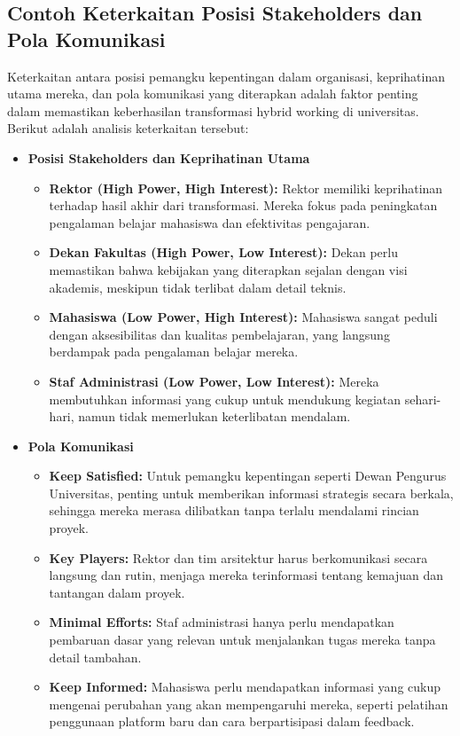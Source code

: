 \subsection*{Contoh Keterkaitan Posisi Stakeholders dan Pola Komunikasi}

Keterkaitan antara posisi pemangku kepentingan dalam organisasi, keprihatinan utama mereka, dan pola komunikasi yang diterapkan adalah faktor penting dalam memastikan keberhasilan transformasi hybrid working di universitas. Berikut adalah analisis keterkaitan tersebut:

\begin{itemize}
	\item \textbf{Posisi Stakeholders dan Keprihatinan Utama}
	\begin{itemize}
		\item \textbf{Rektor (High Power, High Interest):} Rektor memiliki keprihatinan terhadap hasil akhir dari transformasi. Mereka fokus pada peningkatan pengalaman belajar mahasiswa dan efektivitas pengajaran.
		\item \textbf{Dekan Fakultas (High Power, Low Interest):} Dekan perlu memastikan bahwa kebijakan yang diterapkan sejalan dengan visi akademis, meskipun tidak terlibat dalam detail teknis. 
		\item \textbf{Mahasiswa (Low Power, High Interest):} Mahasiswa sangat peduli dengan aksesibilitas dan kualitas pembelajaran, yang langsung berdampak pada pengalaman belajar mereka.
		\item \textbf{Staf Administrasi (Low Power, Low Interest):} Mereka membutuhkan informasi yang cukup untuk mendukung kegiatan sehari-hari, namun tidak memerlukan keterlibatan mendalam.
	\end{itemize}
	
	\item \textbf{Pola Komunikasi}
	\begin{itemize}
		\item \textbf{Keep Satisfied:} Untuk pemangku kepentingan seperti Dewan Pengurus Universitas, penting untuk memberikan informasi strategis secara berkala, sehingga mereka merasa dilibatkan tanpa terlalu mendalami rincian proyek.
		\item \textbf{Key Players:} Rektor dan tim arsitektur harus berkomunikasi secara langsung dan rutin, menjaga mereka terinformasi tentang kemajuan dan tantangan dalam proyek.
		\item \textbf{Minimal Efforts:} Staf administrasi hanya perlu mendapatkan pembaruan dasar yang relevan untuk menjalankan tugas mereka tanpa detail tambahan.
		\item \textbf{Keep Informed:} Mahasiswa perlu mendapatkan informasi yang cukup mengenai perubahan yang akan mempengaruhi mereka, seperti pelatihan penggunaan platform baru dan cara berpartisipasi dalam feedback.
	\end{itemize}
	

\end{itemize}
